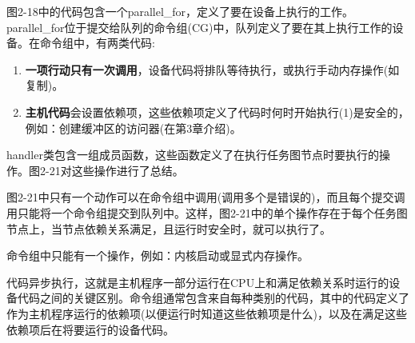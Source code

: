 图2-18中的代码包含一个parallel\_for，定义了要在设备上执行的工作。parallel\_for位于提交给队列的命令组(CG)中，队列定义了要在其上执行工作的设备。在命令组中，有两类代码:\par

\begin{enumerate}
	\item \textbf{一项行动只有一次调用}，设备代码将排队等待执行，或执行手动内存操作(如复制)。
	\item \textbf{主机代码}会设置依赖项，这些依赖项定义了代码时何时开始执行(1)是安全的，例如：创建缓冲区的访问器(在第3章介绍)。
\end{enumerate}

handler类包含一组成员函数，这些函数定义了在执行任务图节点时要执行的操作。图2-21对这些操作进行了总结。\par

图2-21中只有一个动作可以在命令组中调用(调用多个是错误的)，而且每个提交调用只能将一个命令组提交到队列中。这样，图2-21中的单个操作存在于每个任务图节点上，当节点依赖关系满足，且运行时安全时，就可以执行了。\par

\begin{tcolorbox}[colback=red!5!white,colframe=red!75!black]
命令组中只能有一个操作，例如：内核启动或显式内存操作。
\end{tcolorbox}

代码异步执行，这就是主机程序一部分运行在CPU上和满足依赖关系时运行的设备代码之间的关键区别。命令组通常包含来自每种类别的代码，其中的代码定义了作为主机程序运行的依赖项(以便运行时知道这些依赖项是什么)，以及在满足这些依赖项后在将要运行的设备代码。\par

